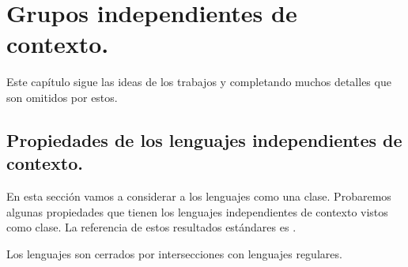 \documentclass[tesis.tex]{subfiles}
\begin{document}
\chapter{Grupos independientes de contexto.}
Este capítulo sigue las ideas de los trabajos \cite{muller1983groups} y \cite{muller1985theory} completando muchos detalles que son omitidos por estos.



\section{Propiedades de los lenguajes independientes de contexto.}

En esta sección vamos a considerar a los lenguajes \ic como una clase. 
Probaremos algunas propiedades que tienen los lenguajes independientes de contexto vistos como clase.
La referencia de estos resultados estándares es \cite{hopcraft-ullman}.

\begin{prop}\label{intersecciones-reg-ic}
	Los lenguajes \ic son cerrados por intersecciones con lenguajes regulares.
\end{prop}
\end{document}
